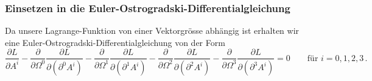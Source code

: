 \subsubsection{Einsetzen in die Euler-Ostrogradski-Differentialgleichung}
Da unsere Lagrange-Funktion von einer Vektorgrösse abhängig ist erhalten wir eine Euler-Ostrogradski-Differentialgleichung von der Form
\[
\frac{\partial L}{\partial A^i} 
- \frac{\partial}{\partial \Omega^0}\frac{\partial L}{\partial(\partial^0 A^i)}
- \frac{\partial}{\partial \Omega^1}\frac{\partial L}{\partial(\partial^1 A^i)}
- \frac{\partial}{\partial \Omega^2}\frac{\partial L}{\partial(\partial^2 A^i)}
- \frac{\partial}{\partial \Omega^3}\frac{\partial L}{\partial(\partial^3 A^i)}
= 0 \qquad \text{für } i=0,1,2,3 \,.
\]




